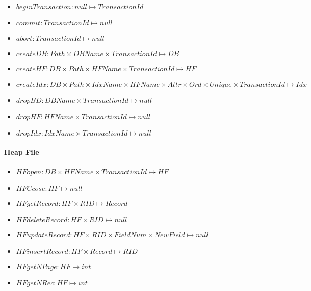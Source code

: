 \begin{itemize}
    \item $beginTransaction : null \mapsto TransactionId$
    
    \item $commit : TransactionId \mapsto null$
    
    \item $abort : TransactionId \mapsto null$
    
    \item $createDB : Path \times DBName \times TransactionId \mapsto DB$
    
    \item $createHF : DB \times Path \times HFName \times TransactionId \mapsto HF$
    
    \item $createIdx : DB \times Path \times IdxName \times HFName \times Attr \times Ord \times Unique \times TransactionId \mapsto Idx$
    
    \item $dropBD : DBName \times TransactionId \mapsto null$
    
    \item $dropHF : HFName \times TransactionId \mapsto null$
    
    \item $dropIdx : IdxName \times TransactionId \mapsto null$
\end{itemize}

\paragraph{Heap File}

\begin{itemize}
    \item $HFopen : DB \times HFName \times TransactionId \mapsto HF$

    \item $HFCcose: HF \mapsto null$

    \item $HFgetRecord : HF \times RID \mapsto Record$

    \item $HFdeleteRecord : HF \times RID \mapsto null$

    \item $HFupdateRecord : HF \times RID \times FieldNum \times NewField \mapsto null$

    \item $HFinsertRecord : HF \times Record \mapsto RID$

    \item $HFgetNPage : HF \mapsto int$

    \item $HFgetNRec : HF \mapsto int$
\end{itemize}

